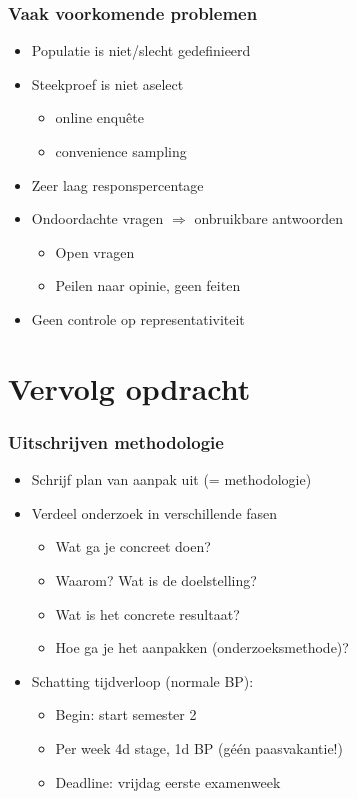 \documentclass[aspectratio=169]{beamer}
\begin{document}
\begin{frame}
  \frametitle{Vaak voorkomende problemen}

  \begin{itemize}
    \item Populatie is niet/slecht gedefinieerd
    \item Steekproef is niet aselect
      \begin{itemize}
        \item online enquête
        \item convenience sampling
      \end{itemize}
    \item Zeer laag responspercentage
    \item Ondoordachte vragen $\Rightarrow$ onbruikbare antwoorden
      \begin{itemize}
        \item Open vragen
        \item Peilen naar opinie, geen feiten
      \end{itemize}
    \item Geen controle op representativiteit
  \end{itemize}

\end{frame}

\section{Vervolg opdracht}

\begin{frame}
  \frametitle{Uitschrijven methodologie}

  \begin{itemize}
    \item Schrijf plan van aanpak uit (= methodologie)
    \item Verdeel onderzoek in verschillende fasen
      \begin{itemize}
        \item Wat ga je concreet doen?
        \item Waarom? Wat is de doelstelling?
        \item Wat is het concrete resultaat?
        \item Hoe ga je het aanpakken (onderzoeksmethode)?
      \end{itemize}
    \item Schatting tijdverloop (normale BP):
      \begin{itemize}
        \item Begin: start semester 2
        \item Per week 4d stage, 1d BP (géén paasvakantie!)
        \item Deadline: vrijdag eerste examenweek
      \end{itemize}
  \end{itemize}

\end{frame}
\end{document}

